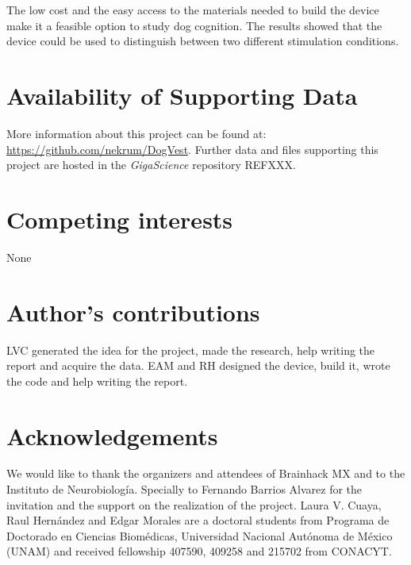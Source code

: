 \documentclass[twocolumn]{bmcart}%
\begin{document}
The low cost and the easy access to the materials needed to build the
device make it a feasible option to study dog cognition. The results
showed that the device could be used to distinguish between two
different stimulation conditions.


\begin{backmatter}

\section*{Availability of Supporting Data}
More information about this project can be found at: \url{https://github.com/nekrum/DogVest}. Further data and files supporting this project are hosted in the \emph{GigaScience} repository REFXXX.

\section*{Competing interests}
None

\section*{Author's contributions}
LVC generated the idea for the project, made the research, help writing
the report and acquire the data. EAM and RH designed the device, build
it, wrote the code and help writing the report.

\section*{Acknowledgements}
We would like to thank the organizers and attendees of Brainhack MX and
to the Instituto de Neurobiología. Specially to Fernando Barrios Alvarez
for the invitation and the support on the realization of the project.
Laura V. Cuaya, Raul Hernández and Edgar Morales are a doctoral students
from Programa de Doctorado en Ciencias Biomédicas, Universidad Nacional
Autónoma de México (UNAM) and received fellowship 407590, 409258 and
215702 from CONACYT.

  
  

\end{backmatter}
\end{document}
